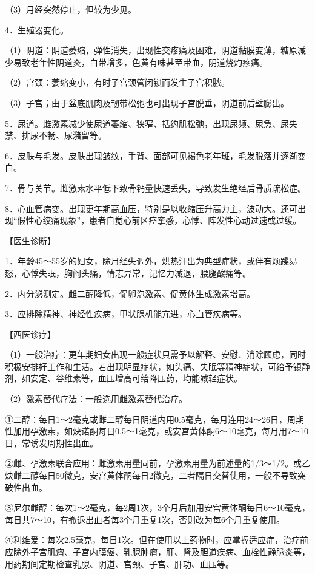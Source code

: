\documentclass[12pt,UTF8,openany]{ctexbook}
\begin{document}
（3）月经突然停止，但较为少见。

4．生殖器变化。

（1）阴道：阴道萎缩，弹性消失，出现性交疼痛及困难，阴道黏膜变薄，糖原减少易致老年性阴道炎，白带增多，色黄有味甚至带血，阴道烧灼疼痛。

（2）宫颈：萎缩变小，有时子宫颈管闭锁而发生子宫积脓。

（3）子宫；由于盆底肌肉及韧带松弛也可出现子宫脱垂，阴道前后壁膨出。

5．尿道。雌激素减少使尿道萎缩、狭窄、括约肌松弛，出现尿频、尿急、尿失禁、排尿不畅、尿潴留等。

6．皮肤与毛发。皮肤出现皱纹，手背、面部可见褐色老年斑，毛发脱落并逐渐变白。

7．骨与关节。雌激素水平低下致骨钙量快速丢失，导致发生绝经后骨质疏松症。

8．心血管病变。出现更年期高血压，特别是以收缩压升高力主，波动大。还可出现“假性心绞痛现象”，患者自觉心前区痉挛感，心悸、阵发性心动过速或过缓。

【医生诊断】

1．年龄45～55岁的妇女，除月经失调外，烘热汗出为典型症状，或伴有烦躁易怒，心悸失眠，胸闷头痛，情志异常，记忆力减退，腰腿酸痛等。

2．内分泌测定。雌二醇降低，促卵泡激素、促黄体生成激素增高。

3．应排除精神、神经性疾病，甲状腺机能亢进，心血管疾病等。

【西医诊疗】

（1）一般治疗：更年期妇女出现一般症状只需予以解释、安慰、消除顾虑，同时积极安排好工作和生活。若出现明显症状，如头痛、失眠等精神症状，可给予镇静剂，如安定、谷维素等，血压增高可给降压药，均能减轻症状。

（2）激素替代疗法：一般选用雌激素替代治疗。

①二醇：每日1～2毫克或雌二醇每日阴道内用0.5毫克，每月连用24～26日，周期性加用孕激素，如炔诺酮每日0.5～1毫克，或安宫黄体酮6～10毫克，每月用7～10日，常诱发周期性出血。

②雌、孕激素联合应用：雌激素用量同前，孕激素用量为前述量的1/3～1/2。或乙炔雌二醇每日50微克，安宫黄体酮每日2微克，二者隔日交替使用，一般不导致突破性出血。

③尼尔雌醇：每次1～2毫克，每2周1次，3个月后加用安宫黄体酮每日6～10毫克，每日共7～10，有撤退出血者每3个月重复1次，否则改为每6个月重复使用。

④利维爱：每次2.5毫克，每日1次。但在使用以上药物时，应掌握适应症，治疗前应除外子宫肌瘤、子宫内膜癌、乳腺肿瘤，肝、肾及胆道疾病、血栓性静脉炎等，用药期间定期检查乳腺、阴道、宫颈、子宫、肝功、血压等。
\end{document}
